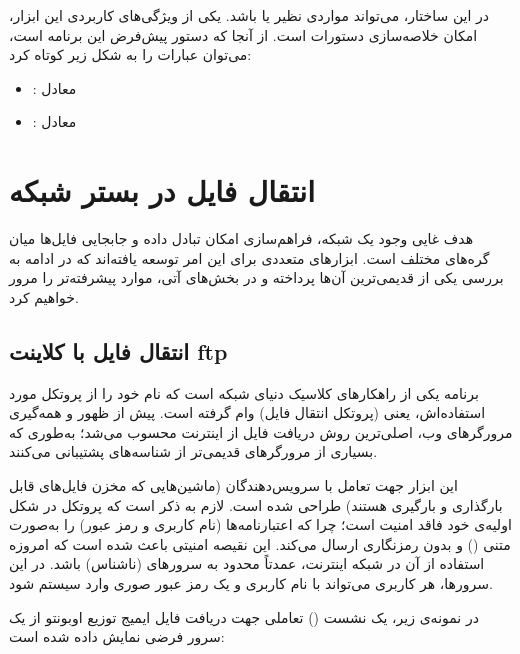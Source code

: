 در این ساختار،  می‌تواند مواردی نظیر  یا  باشد. یکی از ویژگی‌های کاربردی این ابزار، امکان خلاصه‌سازی دستورات است. از آنجا که دستور پیش‌فرض این برنامه  است، می‌توان عبارات را به شکل زیر کوتاه کرد:

\begin{itemize}
  \item {}: معادل 
  \item {}: معادل 
\end{itemize}

\section{انتقال فایل در بستر شبکه}

هدف غایی وجود یک شبکه، فراهم‌سازی امکان تبادل داده و جابجایی فایل‌ها میان گره‌های مختلف است. ابزارهای متعددی برای این امر توسعه یافته‌اند که در ادامه به بررسی یکی از قدیمی‌ترین آن‌ها پرداخته و در بخش‌های آتی، موارد پیشرفته‌تر را مرور خواهیم کرد.

\subsection{انتقال فایل با کلاینت ftp}

برنامه  یکی از راهکارهای کلاسیک دنیای شبکه است که نام خود را از پروتکل مورد استفاده‌اش، یعنی  (پروتکل انتقال فایل) وام گرفته است. پیش از ظهور و همه‌گیری مرورگرهای وب،  اصلی‌ترین روش دریافت فایل از اینترنت محسوب می‌شد؛ به‌طوری که بسیاری از مرورگرهای قدیمی‌تر از شناسه‌های  پشتیبانی می‌کنند.

این ابزار جهت تعامل با سرویس‌دهندگان  (ماشین‌هایی که مخزن فایل‌های قابل بارگذاری و بارگیری هستند) طراحی شده است. لازم به ذکر است که پروتکل  در شکل اولیه‌ی خود فاقد امنیت است؛ چرا که اعتبارنامه‌ها (نام کاربری و رمز عبور) را به‌صورت متنی () و بدون رمزنگاری ارسال می‌کند. این نقیصه امنیتی باعث شده است که امروزه استفاده از آن در شبکه اینترنت، عمدتاً محدود به سرورهای  (ناشناس) باشد. در این سرورها، هر کاربری می‌تواند با نام کاربری  و یک رمز عبور صوری وارد سیستم شود.

در نمونه‌ی زیر، یک نشست () تعاملی جهت دریافت فایل ایمیج  توزیع اوبونتو از یک سرور فرضی نمایش داده شده است:

